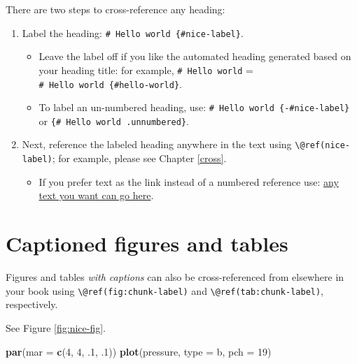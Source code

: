 \documentclass[
]{book}
\newenvironment{Shaded}{\begin{snugshade}}{\end{snugshade}}
\newcommand{\AttributeTok}[1]{\textcolor[rgb]{0.13,0.29,0.53}{#1}}
\newcommand{\DecValTok}[1]{\textcolor[rgb]{0.00,0.00,0.81}{#1}}
\newcommand{\FunctionTok}[1]{\textcolor[rgb]{0.13,0.29,0.53}{\textbf{#1}}}
\newcommand{\NormalTok}[1]{#1}
\newcommand{\StringTok}[1]{\textcolor[rgb]{0.31,0.60,0.02}{#1}}
\providecommand{\tightlist}{%
  \setlength{\itemsep}{0pt}\setlength{\parskip}{0pt}}
\theoremstyle{definition}
\theoremstyle{definition}
\theoremstyle{definition}
\theoremstyle{definition}
\theoremstyle{remark}
\begin{document}
There are two steps to cross-reference any heading:

\begin{enumerate}
\def\labelenumi{\arabic{enumi}.}
\tightlist
\item
  Label the heading: \texttt{\#\ Hello\ world\ \{\#nice-label\}}.

  \begin{itemize}
  \tightlist
  \item
    Leave the label off if you like the automated heading generated based on your heading title: for example, \texttt{\#\ Hello\ world} = \texttt{\#\ Hello\ world\ \{\#hello-world\}}.
  \item
    To label an un-numbered heading, use: \texttt{\#\ Hello\ world\ \{-\#nice-label\}} or \texttt{\{\#\ Hello\ world\ .unnumbered\}}.
  \end{itemize}
\item
  Next, reference the labeled heading anywhere in the text using \texttt{\textbackslash{}@ref(nice-label)}; for example, please see Chapter \ref{cross}.

  \begin{itemize}
  \tightlist
  \item
    If you prefer text as the link instead of a numbered reference use: \protect\hyperlink{cross}{any text you want can go here}.
  \end{itemize}
\end{enumerate}

\hypertarget{captioned-figures-and-tables}{%
\section{Captioned figures and tables}\label{captioned-figures-and-tables}}

Figures and tables \emph{with captions} can also be cross-referenced from elsewhere in your book using \texttt{\textbackslash{}@ref(fig:chunk-label)} and \texttt{\textbackslash{}@ref(tab:chunk-label)}, respectively.

See Figure \ref{fig:nice-fig}.

\begin{Shaded}
\begin{Highlighting}[]
\FunctionTok{par}\NormalTok{(}\AttributeTok{mar =} \FunctionTok{c}\NormalTok{(}\DecValTok{4}\NormalTok{, }\DecValTok{4}\NormalTok{, .}\DecValTok{1}\NormalTok{, .}\DecValTok{1}\NormalTok{))}
\FunctionTok{plot}\NormalTok{(pressure, }\AttributeTok{type =} \StringTok{\textquotesingle{}b\textquotesingle{}}\NormalTok{, }\AttributeTok{pch =} \DecValTok{19}\NormalTok{)}
\end{Highlighting}
\end{Shaded}
\end{document}

